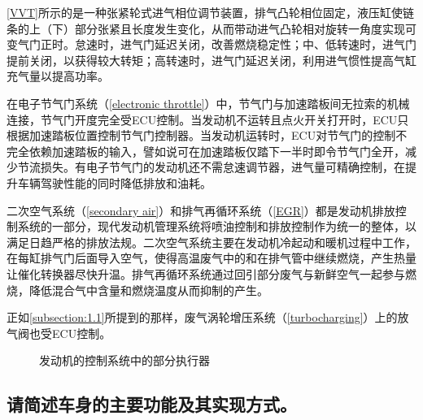 \documentclass[UTF8]{ctexart}
\numberwithin{figure}{section}
\numberwithin{table}{section}
\begin{document}
\cref{VVT}所示的是一种张紧轮式进气相位调节装置，排气凸轮相位固定，液压缸使链条的上（下）部分张紧且长度发生变化，从而带动进气凸轮相对旋转一角度实现可变气门正时。怠速时，进气门延迟关闭，改善燃烧稳定性；中、低转速时，进气门提前关闭，以获得较大转矩；高转速时，进气门延迟关闭，利用进气惯性提高气缸充气量以提高功率。

在电子节气门系统（\cref{electronic throttle}）中，节气门与加速踏板间无拉索的机械连接，节气门开度完全受ECU控制。当发动机不运转且点火开关打开时，ECU只根据加速踏板位置控制节气门控制器。当发动机运转时，ECU对节气门的控制不完全依赖加速踏板的输入，譬如说可在加速踏板仅踏下一半时即令节气门全开，减少节流损失。有电子节气门的发动机还不需怠速调节器，进气量可精确控制，在提升车辆驾驶性能的同时降低排放和油耗。

二次空气系统（\cref{secondary air}）和排气再循环系统（\cref{EGR}）都是发动机排放控制系统的一部分，现代发动机管理系统将喷油控制和排放控制作为统一的整体，以满足日趋严格的排放法规。二次空气系统主要在发动机冷起动和暖机过程中工作，在每缸排气门后面导入空气，使得高温废气中的和在排气管中继续燃烧，产生热量让催化转换器尽快升温。排气再循环系统通过回引部分废气与新鲜空气一起参与燃烧，降低混合气中含量和燃烧温度从而抑制的产生。

正如\cref{subsection:1.1}所提到的那样，废气涡轮增压系统（\cref{turbocharging}）上的放气阀也受ECU控制。

\begin{figure}[htbp]
	\centering
	\caption{发动机的控制系统中的部分执行器}
	\label{actuators}
\end{figure}

\subsection{请简述车身的主要功能及其实现方式。}
\end{document}
